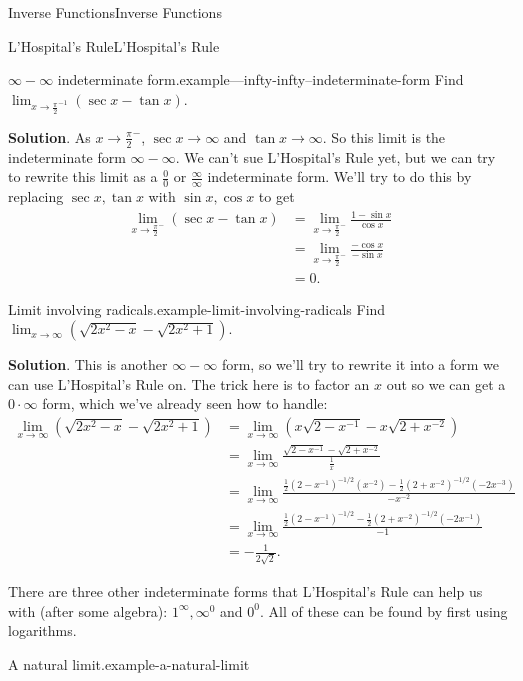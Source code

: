 \documentclass[10pt,]{book}
\numberwithin{equation}{section}
\begin{document}
\begin{chapterptx}{Inverse Functions}{}{Inverse Functions}{}{}
\begin{sectionptx}{L'Hospital's Rule}{}{L'Hospital's Rule}{}{}
\begin{example}{\(\infty-\infty\) indeterminate form.}{example---infty-infty--indeterminate-form}
\hypertarget{p-301}{}%
Find \(\lim_{x\to\frac{\pi}{2}^{-1}}(\sec x-\tan x)\).%
\par\smallskip%
\noindent\textbf{Solution}.\hypertarget{solution-67}{}\quad%
\hypertarget{p-302}{}%
As \(x\to\frac{\pi}{2}^{-}\), \(\sec x\to\infty\) and \(\tan x\to\infty\). So this limit is the indeterminate form \(\infty-\infty\). We can't sue L'Hospital's Rule yet, but we can try to rewrite this limit as a \(\frac{0}{0}\) or \(\frac{\infty}{\infty}\) indeterminate form. We'll try to do this by replacing \(\sec x,\tan x\) with \(\sin x,\cos x\) to get%
\begin{align*}
\lim_{x\to\frac{\pi}{2}^{-}}(\sec x - \tan x) & =\lim_{x\to\frac{\pi}{2}^{-}}\frac{1-\sin x}{\cos x} \\
& = \lim_{x\to\frac{\pi}{2}^{-}}\frac{-\cos x}{-\sin x} \\
& = 0. 
\end{align*}
%
\end{example}
\begin{example}{Limit involving radicals.}{example-limit-involving-radicals}%
\hypertarget{p-303}{}%
Find \(\lim_{x\to\infty}(\sqrt{2x^{2} - x} - \sqrt{2x^{2}+1})\).%
\par\smallskip%
\noindent\textbf{Solution}.\hypertarget{solution-68}{}\quad%
\hypertarget{p-304}{}%
This is another \(\infty-\infty\) form, so we'll try to rewrite it into a form we can use L'Hospital's Rule on. The trick here is to factor an \(x\) out so we can get a \(0\cdot\infty\) form, which we've already seen how to handle:%
\begin{align*}
\lim_{x\to\infty}(\sqrt{2x^{2} - x} - \sqrt{2x^{2} + 1}) & = \lim_{x\to\infty}(x\sqrt{2 - x^{-1}} - x\sqrt{2+x^{-2}}) \\
& = \lim_{x\to\infty}\frac{\sqrt{2 - x^{-1}} - \sqrt{2+x^{-2}}}{\frac{1}{x}} \\
& = \lim_{x\to\infty}\frac{\frac{1}{2}(2-x^{-1})^{-1/2}(x^{-2}) - \frac{1}{2}(2+x^{-2})^{-1/2}(-2x^{-3})}{-x^{-2}} \\
& = \lim_{x\to\infty}\frac{\frac{1}{2}(2 - x^{-1})^{-1/2} - \frac{1}{2}(2+x^{-2})^{-1/2}(-2x^{-1})}{-1} \\
& = -\frac{1}{2\sqrt{2}}.
\end{align*}
%
\end{example}
\hypertarget{p-305}{}%
There are three other indeterminate forms that L'Hospital's Rule can help us with (after some algebra): \(1^{\infty}, \infty^{0}\) and \(0^{0}\). All of these can be found by first using logarithms.%
\begin{example}{A natural limit.}{example-a-natural-limit}%

\end{example}
\end{sectionptx}
\end{chapterptx}
\end{document}
